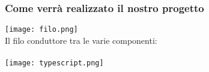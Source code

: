 \begin{frame}
  \frametitle{Come verrà realizzato il nostro progetto}
  \centering
  \texttt{[image: filo.png]} \\
  Il filo conduttore tra le varie componenti:\\
  \\
  \texttt{[image: typescript.png]}
\end{frame}
